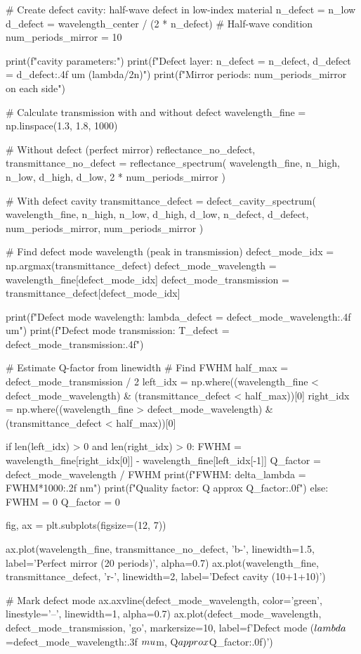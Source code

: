 \documentclass[11pt,a4paper]{article}
\begin{document}
\begin{pycode}
# Create defect cavity: half-wave defect in low-index material
n_defect = n_low
d_defect = wavelength_center / (2 * n_defect)  # Half-wave condition
num_periods_mirror = 10

print(f"\nDefect cavity parameters:")
print(f"Defect layer: n_defect = {n_defect}, d_defect = {d_defect:.4f} um (lambda/2n)")
print(f"Mirror periods: {num_periods_mirror} on each side")

# Calculate transmission with and without defect
wavelength_fine = np.linspace(1.3, 1.8, 1000)

# Without defect (perfect mirror)
reflectance_no_defect, transmittance_no_defect = reflectance_spectrum(
    wavelength_fine, n_high, n_low, d_high, d_low, 2 * num_periods_mirror
)

# With defect cavity
transmittance_defect = defect_cavity_spectrum(
    wavelength_fine, n_high, n_low, d_high, d_low,
    n_defect, d_defect, num_periods_mirror, num_periods_mirror
)

# Find defect mode wavelength (peak in transmission)
defect_mode_idx = np.argmax(transmittance_defect)
defect_mode_wavelength = wavelength_fine[defect_mode_idx]
defect_mode_transmission = transmittance_defect[defect_mode_idx]

print(f"Defect mode wavelength: lambda_defect = {defect_mode_wavelength:.4f} um")
print(f"Defect mode transmission: T_defect = {defect_mode_transmission:.4f}")

# Estimate Q-factor from linewidth
# Find FWHM
half_max = defect_mode_transmission / 2
left_idx = np.where((wavelength_fine < defect_mode_wavelength) &
                    (transmittance_defect < half_max))[0]
right_idx = np.where((wavelength_fine > defect_mode_wavelength) &
                     (transmittance_defect < half_max))[0]

if len(left_idx) > 0 and len(right_idx) > 0:
    FWHM = wavelength_fine[right_idx[0]] - wavelength_fine[left_idx[-1]]
    Q_factor = defect_mode_wavelength / FWHM
    print(f"FWHM: delta_lambda = {FWHM*1000:.2f} nm")
    print(f"Quality factor: Q approx {Q_factor:.0f}")
else:
    FWHM = 0
    Q_factor = 0

fig, ax = plt.subplots(figsize=(12, 7))

ax.plot(wavelength_fine, transmittance_no_defect, 'b-', linewidth=1.5,
        label='Perfect mirror (20 periods)', alpha=0.7)
ax.plot(wavelength_fine, transmittance_defect, 'r-', linewidth=2,
        label='Defect cavity (10+1+10)')

# Mark defect mode
ax.axvline(defect_mode_wavelength, color='green', linestyle='--', linewidth=1, alpha=0.7)
ax.plot(defect_mode_wavelength, defect_mode_transmission, 'go', markersize=10,
        label=f'Defect mode ($\\lambda$={defect_mode_wavelength:.3f} $\\mu$m, Q$\\approx${Q_factor:.0f})')


\end{pycode}
\end{document}
